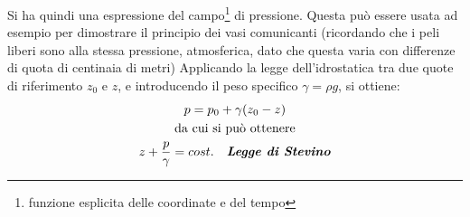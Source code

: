 Si ha quindi una espressione del campo\footnote{funzione esplicita delle coordinate e del tempo} di pressione. 
Questa può essere usata ad esempio per dimostrare il principio dei vasi comunicanti (ricordando che i peli liberi sono alla stessa pressione, atmosferica, dato che questa varia con differenze di quota di centinaia di metri)
Applicando la legge dell'idrostatica tra due quote di riferimento $z_0$ e $z$, e introducendo il peso specifico $\gamma = \rho g$, si ottiene:
	\begin{equation*}
		\begin{gathered}
			p = p_0 + \gamma (z_0 - z) \\
			\text{da cui si può ottenere} \\
			z + \frac{p}{\gamma} = cost. \quad \textbf{\textit{Legge di Stevino}}
		\end{gathered}
	\end{equation*}
%
